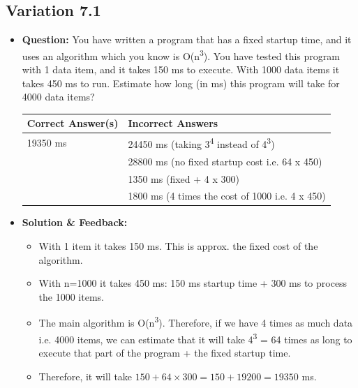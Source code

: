 \subsection{Variation 7.1}
\begin{itemize}
    \item \textbf{Question:} You have written a program that has a fixed startup time, and it uses an algorithm which you know is O(n\textsuperscript{3}). You have tested this program with 1 data item, and it takes 150 ms to execute. With 1000 data items it takes 450 ms to run. Estimate how long (in ms) this program will take for 4000 data items?
    
    \begin{tabular}{|l|l|}
        \hline
        \textbf{Correct Answer(s)} & \textbf{Incorrect Answers} \\
        \hline
        19350 ms & 24450 ms (taking 3\textsuperscript{4} instead of 4\textsuperscript{3}) \\
         & 28800 ms (no fixed startup cost i.e. 64 x 450) \\
         & 1350 ms (fixed + 4 x 300) \\
         & 1800 ms (4 times the cost of 1000 i.e. 4 x 450) \\
        \hline
    \end{tabular}
    
    \item \textbf{Solution \& Feedback:}
    \begin{itemize}
        \item With 1 item it takes 150 ms. This is approx. the fixed cost of the algorithm.
        \item With n=1000 it takes 450 ms: 150 ms startup time + 300 ms to process the 1000 items.
        \item The main algorithm is O(n\textsuperscript{3}). Therefore, if we have 4 times as much data i.e. 4000 items, we can estimate that it will take 4\textsuperscript{3} = 64 times as long to execute that part of the program + the fixed startup time.
        \item Therefore, it will take \( 150 + 64 \times 300 = 150 + 19200 = 19350 \) ms.
    \end{itemize}
\end{itemize}

